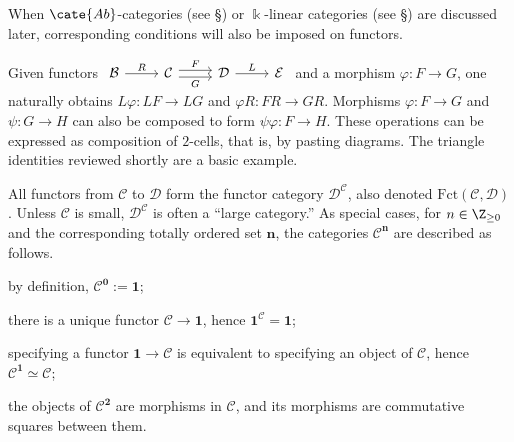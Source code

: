 When $\cate{Ab}$-categories (see \S{}) or $\Bbbk$-linear categories (see \S{}) are discussed later, corresponding conditions will also be imposed on functors.

Given functors
$\begin{tikzcd}
	\mathcal{B} \arrow[r, "R"] & \mathcal{C} \arrow[shift left, r, "F"] \arrow[shift right, r, "G"'] & \mathcal{D} \arrow[r, "L"] & \mathcal{E}
\end{tikzcd}$
and a morphism $\varphi:F\to G$, one naturally obtains $L\varphi:LF\to LG$ and $\varphi R:FR\to GR$. Morphisms $\varphi:F\to G$ and $\psi:G\to H$ can also be composed to form $\psi\varphi:F\to H$. These operations can be expressed as composition of $2$-cells, that is, by pasting diagrams. The triangle identities reviewed shortly are a basic example.

All functors from $\mathcal C$ to $\mathcal D$ form the functor category $\mathcal D^{\mathcal C}$, also denoted $\mathrm{Fct}(\mathcal C,\mathcal D)$. Unless $\mathcal C$ is small, $\mathcal D^{\mathcal C}$ is often a ``large category.'' As special cases, for $n\in\Z_{\geq0}$ and the corresponding totally ordered set $\mathbf n$, the categories $\mathcal C^{\mathbf n}$ are described as follows.

\begin{compactitem}
	\item by definition, $\mathcal C^{\mathbf0}:=\mathbf1$;
	\item there is a unique functor $\mathcal C\to\mathbf1$, hence $\mathbf1^{\mathcal C}=\mathbf1$;
	\item specifying a functor $\mathbf1\to\mathcal C$ is equivalent to specifying an object of $\mathcal C$, hence $\mathcal C^{\mathbf1}\simeq\mathcal C$;
	\item the objects of $\mathcal C^{\mathbf2}$ are morphisms in $\mathcal C$, and its morphisms are commutative squares between them.
\end{compactitem}

